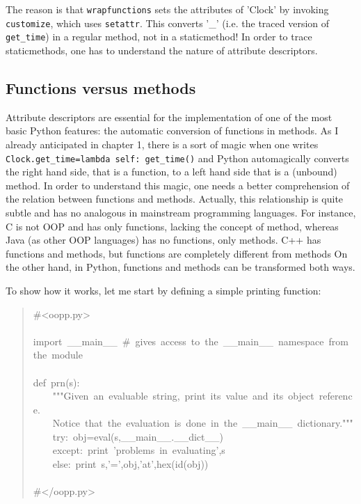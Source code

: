 \documentclass[10pt,english]{article}
\begin{document}
The reason is that \texttt{wrapfunctions} sets the attributes of 'Clock'
by invoking \texttt{customize}, which uses \texttt{setattr}. This converts
'{\_}' (i.e. the traced version of \texttt{get{\_}time}) in a regular method, not in 
a staticmethod!
In order to trace staticmethods, one has to understand the nature 
of attribute descriptors.



\hypertarget{functions-versus-methods}{}
\subsection*{Functions versus methods}

Attribute descriptors are essential for the implementation 
of one of the most basic Python features: the automatic conversion 
of functions in methods. As I already anticipated in chapter 1, there is 
a sort of magic when one writes \texttt{Clock.get{\_}time=lambda self: get{\_}time()}
and Python automagically converts the right hand side, that is a
function, to a left hand side that is a (unbound) method. In order to 
understand this magic, one needs a better comprehension of the
relation between functions and methods.
Actually, this relationship is quite subtle 
and has no analogous in mainstream programming languages.
For instance, C is not OOP and has only functions, lacking the concept
of method, whereas Java (as other OOP languages) 
has no functions,  only methods.
C++ has functions and methods, but functions are completely
different from methods On the other hand, in Python, 
functions and methods can be transformed both ways.

To show how it works, let me start by defining a simple printing 
function:
\begin{quote}
\begin{ttfamily}\begin{flushleft}
\mbox{{\#}<oopp.py>}\\
\mbox{}\\
\mbox{import~{\_}{\_}main{\_}{\_}~{\#}~gives~access~to~the~{\_}{\_}main{\_}{\_}~namespace~from~the~module}\\
\mbox{}\\
\mbox{def~prn(s):}\\
\mbox{~~~~"""Given~an~evaluable~string,~print~its~value~and~its~object~reference.}\\
\mbox{~~~~Notice~that~the~evaluation~is~done~in~the~{\_}{\_}main{\_}{\_}~dictionary."""}\\
\mbox{~~~~try:~obj=eval(s,{\_}{\_}main{\_}{\_}.{\_}{\_}dict{\_}{\_})}\\
\mbox{~~~~except:~print~'problems~in~evaluating',s}\\
\mbox{~~~~else:~print~s,'=',obj,'at',hex(id(obj))}\\
\mbox{}\\
\mbox{{\#}</oopp.py>}
\end{flushleft}\end{ttfamily}
\end{quote}
\end{document}
